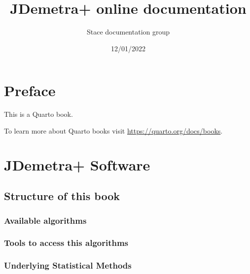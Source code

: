 \documentclass[
  letterpaper,
  DIV=11,
  numbers=noendperiod]{scrreprt}
\title{JDemetra+ online documentation}
\author{Stace documentation group}
\date{12/01/2022}
\renewcommand*\contentsname{Table of contents}
\newcommand\contentsname{Table of contents}
\begin{document}
\maketitle
\ifdefined\Shaded\renewenvironment{Shaded}{\begin{tcolorbox}[interior hidden, borderline west={3pt}{0pt}{shadecolor}, boxrule=0pt, frame hidden, enhanced, breakable, sharp corners]}{\end{tcolorbox}}\fi

\renewcommand*\contentsname{Table of contents}
{
\hypersetup{linkcolor=}
\setcounter{tocdepth}{2}
\tableofcontents
}
\hypertarget{preface}{%
\chapter*{Preface}\label{preface}}

This is a Quarto book.

To learn more about Quarto books visit
\url{https://quarto.org/docs/books}.

\hypertarget{jdemetra-software}{%
\chapter{JDemetra+ Software}\label{jdemetra-software}}

\hypertarget{structure-of-this-book}{%
\section{Structure of this book}\label{structure-of-this-book}}

\hypertarget{available-algorithms}{%
\subsection{Available algorithms}\label{available-algorithms}}

\hypertarget{tools-to-access-this-algorithms}{%
\subsection{Tools to access this
algorithms}\label{tools-to-access-this-algorithms}}

\hypertarget{underlying-statistical-methods}{%
\subsection{Underlying Statistical
Methods}\label{underlying-statistical-methods}}
\end{document}
